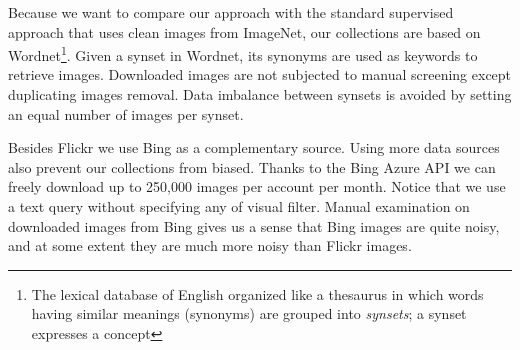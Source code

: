 \documentclass[preprint,12pt]{elsarticle}
\begin{document}
Because we want to compare our approach with the standard supervised approach that uses clean images from ImageNet, our collections are based on Wordnet\footnote{The lexical database of English organized like a thesaurus in which words having similar meanings (synonyms) are grouped into \emph{synsets}; a synset expresses a concept}. Given a synset in Wordnet, its synonyms are used as keywords to retrieve images. Downloaded images are not subjected to manual screening except duplicating images removal. Data imbalance between synsets is avoided by setting an equal number of images per synset. 

Besides Flickr we use Bing as a  complementary source. Using more data sources also prevent our collections from  biased. Thanks to the Bing Azure API we can freely download up to 250,000 images per account per month. Notice that we use a text query without specifying any of visual filter. Manual examination on downloaded images from Bing gives us a sense that Bing images are quite noisy, and at some extent they are much more noisy than Flickr images.
\end{document}
